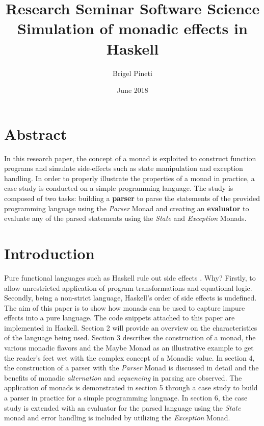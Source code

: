 \documentclass[a4paper, onecolumn]{article}
\title{\Large{Research Seminar Software Science} \\
    \huge{Simulation of monadic effects in Haskell}}
\author{Brigel Pineti}
\date{June 2018}
\begin{document}
    
    \maketitle
    
    \section*{Abstract}
    
    In this research paper, the concept of a monad is exploited to construct function programs and simulate side-effects such as state manipulation and exception handling. In order to properly illustrate the properties of a monad in practice, a case study is conducted on a simple programming language. The study is composed of two tasks: building a \textbf{parser} to parse the statements of the provided programming language using the \textit{Parser} Monad and creating an \textbf{evaluator} to evaluate any of the parsed statements using the \textit{State} and \textit{Exception} Monads. 
    
    \section{Introduction}
    
    Pure functional languages such as Haskell rule out side effects \cite{history}. Why? Firstly, to allow unrestricted application of program transformations and equational logic. Secondly, being a non-strict language, Haskell's order of side effects is undefined. The aim of this paper is to show how monads can be used to capture impure effects into a pure language. The code snippets attached to this paper are implemented in Haskell. Section 2 will provide an overview on the characteristics of the language being used. Section 3 describes the construction of a monad, the various monadic flavors and the Maybe Monad as an illustrative example to get the reader's feet wet with the complex concept of a Monadic value. In section 4, the construction of a parser with the \textit{Parser} Monad is discussed in detail and the benefits of monadic \textit{alternation} and \textit{sequencing} in parsing are observed. The application of monads is demonstrated in section 5 through a case study to build a parser in practice for a simple programming language. In section 6, the case study is extended with an evaluator for the parsed language using the \textit{State} monad and error handling is included by utilizing the \textit{Exception} Monad. 
    
\end{document}

